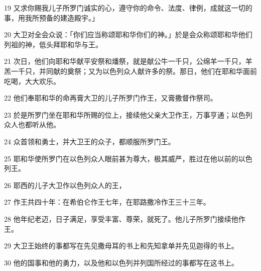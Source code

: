 \par 19 又求你赐我儿子所罗门诚实的心，遵守你的命令、法度、律例，成就这一切的事，用我所预备的建造殿宇。」
\par 20 大卫对全会众说：「你们应当称颂耶和华你们的神。」於是会众称颂耶和华他们列祖的神，低头拜耶和华与王。
\par 21 次日，他们向耶和华献平安祭和燔祭，就是献公牛一千只，公绵羊一千只，羊羔一千只，并同献的奠祭；又为以色列众人献许多的祭。那日，他们在耶和华面前吃喝，大大欢乐。
\par 22 他们奉耶和华的命再膏大卫的儿子所罗门作王，又膏撒督作祭司。
\par 23 於是所罗门坐在耶和华所赐的位上，接续他父亲大卫作王，万事亨通；以色列众人也都听从他。
\par 24 众首领和勇士，并大卫王的众子，都顺服所罗门王。
\par 25 耶和华使所罗门在以色列众人眼前甚为尊大，极其威严，胜过在他以前的以色列王。
\par 26 耶西的儿子大卫作以色列众人的王，
\par 27 作王共四十年：在希伯仑作王七年，在耶路撒冷作王三十三年。
\par 28 他年纪老迈，日子满足，享受丰富、尊荣，就死了。他儿子所罗门接续他作王。
\par 29 大卫王始终的事都写在先见撒母耳的书上和先知拿单并先见迦得的书上。
\par 30 他的国事和他的勇力，以及他和以色列并列国所经过的事都写在这书上。


